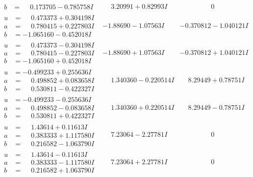 \documentclass[1p]{elsarticle_modified}
\theoremstyle{definition}
\begin{document}
$$\begin{array}{c|c|c}
\begin{aligned}
b &= \phantom{-}0.173705 - 0.785758 I\end{aligned}
 & \phantom{-}3.20991 + 0.82993 I & \phantom{-0.000000 } 0 \\ \hline\begin{aligned}
u &= \phantom{-}0.473373 + 0.304198 I \\
a &= \phantom{-}0.780415 + 0.227803 I \\
b &= -1.065160 - 0.452018 I\end{aligned}
 & -1.88690 - 1.07563 I & -0.370812 - 1.040121 I \\ \hline\begin{aligned}
u &= \phantom{-}0.473373 - 0.304198 I \\
a &= \phantom{-}0.780415 - 0.227803 I \\
b &= -1.065160 + 0.452018 I\end{aligned}
 & -1.88690 + 1.07563 I & -0.370812 + 1.040121 I \\ \hline\begin{aligned}
u &= -0.499233 + 0.255636 I \\
a &= \phantom{-}0.498852 + 0.083658 I \\
b &= \phantom{-}0.530811 - 0.422327 I\end{aligned}
 & \phantom{-}1.340360 - 0.220514 I & \phantom{-}8.29449 + 0.78751 I \\ \hline\begin{aligned}
u &= -0.499233 - 0.255636 I \\
a &= \phantom{-}0.498852 - 0.083658 I \\
b &= \phantom{-}0.530811 + 0.422327 I\end{aligned}
 & \phantom{-}1.340360 + 0.220514 I & \phantom{-}8.29449 - 0.78751 I \\ \hline\begin{aligned}
u &= \phantom{-}1.43614 + 0.11613 I \\
a &= \phantom{-}0.383333 + 1.117580 I \\
b &= \phantom{-}0.216582 - 1.063790 I\end{aligned}
 & \phantom{-}7.23064 - 2.27781 I & \phantom{-0.000000 } 0 \\ \hline\begin{aligned}
u &= \phantom{-}1.43614 - 0.11613 I \\
a &= \phantom{-}0.383333 - 1.117580 I \\
b &= \phantom{-}0.216582 + 1.063790 I\end{aligned}
 & \phantom{-}7.23064 + 2.27781 I & \phantom{-0.000000 } 0 \\ \hline\begin{aligned}

\end{aligned}
\end{array}$$
\end{document}
